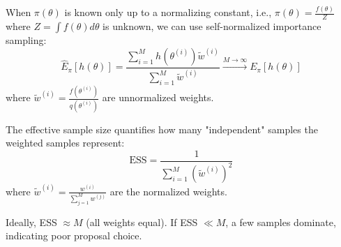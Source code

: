 \begin{corollary}\label{cor:self_normalized_IS}
When $\pi(\theta)$ is known only up to a normalizing constant, i.e., $\pi(\theta) = \frac{f(\theta)}{Z}$ where $Z = \int f(\theta) d\theta$ is unknown, we can use self-normalized importance sampling:
$$\hat{E}_{\pi}[h(\theta)] = \frac{\sum_{i=1}^M h(\theta^{(i)}) \tilde{w}^{(i)}}{\sum_{i=1}^M \tilde{w}^{(i)}} \xrightarrow{M \to \infty} E_{\pi}[h(\theta)]$$
where $\tilde{w}^{(i)} = \frac{f(\theta^{(i)})}{q(\theta^{(i)})}$ are unnormalized weights.
\end{corollary}

\begin{definition}
The effective sample size quantifies how many "independent" samples the weighted samples represent:
$$\text{ESS} = \frac{1}{\sum_{i=1}^M (\tilde{w}^{(i)})^2}$$
where $\tilde{w}^{(i)} = \frac{w^{(i)}}{\sum_{j=1}^M w^{(j)}}$ are the normalized weights.

Ideally, ESS $\approx M$ (all weights equal). If ESS $\ll M$, a few samples dominate, indicating poor proposal choice.
\end{definition}


